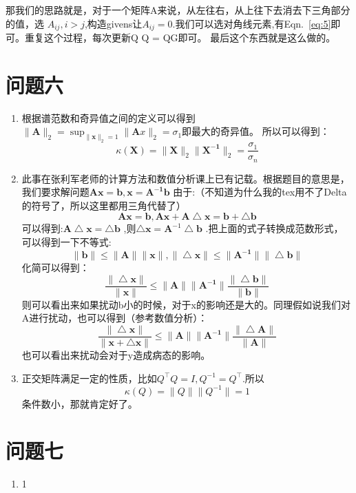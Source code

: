 \documentclass[answers]{exam}  %
\begin{document}
\begin{enumerate}[label=\alph*.]
    那我们的思路就是，对于一个矩阵A来说，从左往右，从上往下去消去下三角部分的值，选
    $A_{ij},i>j$,构造givens让$A_{ij}=0$.我们可以选对角线元素,有Eqn.~\ref{eq:5}即可。重复这个过程，每次更新Q
    Q = QG即可。
    最后这个东西就是这么做的。

\end{enumerate}

\section{问题六}
\begin{enumerate}[label=\alph*.] 
    \item 根据谱范数和奇异值之间的定义可以得到$\|\mathbf{A}\|_2 = \sup_{\|\mathbf{x}\|_2 = 1} \|\mathbf{A}x\|_2 = \sigma_1$即最大的奇异值。
    所以可以得到：
    \begin{equation*}
        \kappa(\mathbf{X}) =  \|\mathbf{X}\|_2 \|\mathbf{X^{-1}}\|_2 = \frac{\sigma_1}{\sigma_n}
    \end{equation*}
    \item 此事在张利军老师的计算方法和数值分析课上已有记载。根据题目的意思是，我们要求解问题$\mathbf{Ax} = \mathbf{b},\mathbf{x} = \mathbf{A^{-1}b}$
    由于:（不知道为什么我的tex用不了Delta的符号了，所以这里都用三角代替了）
    \begin{equation*}
        \mathbf{Ax} = \mathbf{b}, \mathbf{Ax+ A \bigtriangleup x} = \mathbf{b+ \bigtriangleup b}
    \end{equation*}
    可以得到:$\mathbf{A}\bigtriangleup \mathbf{x} = \bigtriangleup\mathbf{b}$
    ,则$\bigtriangleup  \mathbf{x}  = \mathbf{A}^{-1}\bigtriangleup\mathbf{b}$
    .把上面的式子转换成范数形式，可以得到一下不等式:
    \begin{equation*}
        \|\mathbf{b}\| \leq \|\mathbf{A}\| \|\mathbf{x}\|, \|\bigtriangleup\mathbf{x} \| \leq \|\mathbf{A^{-1}}\| \|\bigtriangleup\mathbf{b} \| 
    \end{equation*}
    化简可以得到：
    \begin{equation*}
        \frac{ \|\bigtriangleup\mathbf{x} \| }{ \|\mathbf{x} \| } \leq  \|\mathbf{A} \|  \|\mathbf{A^{-1}} \| \frac{ \|\bigtriangleup\mathbf{b} \| }{ \|\mathbf{b} \| } 
    \end{equation*}
    则可以看出来如果扰动b小的时候，对于x的影响还是大的。同理假如说我们对A进行扰动，也可以得到（参考数值分析）：
    \begin{equation*}
        \frac{ \|\bigtriangleup\mathbf{x} \| }{ \|\mathbf{x}+\bigtriangleup\mathbf{x}\| } \leq  \|\mathbf{A} \|  \|\mathbf{A^{-1}} \| \frac{ \|\bigtriangleup\mathbf{A} \| }{ \|\mathbf{A} \| } 
    \end{equation*}
    也可以看出来扰动会对于y造成病态的影响。
    \item 正交矩阵满足一定的性质，比如$Q^\top Q = I,Q^{-1} = Q^\top$.所以
    \begin{equation*}
        \kappa(Q) = \|Q\| \|Q^{-1}\| = 1
    \end{equation*}
    条件数小，那就肯定好了。
\end{enumerate}

\section{问题七}
\begin{enumerate}[label=\alph*.] 
    \item 1
\end{enumerate}
\end{document}

